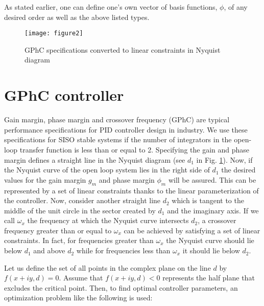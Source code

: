 \documentclass [12pt , a4paper] {report}
\begin{document}
As stated earlier, one can define one's own vector of basis functions, $\phi$, of any desired order as well as the above listed types.

\begin{figure}
\centering
{}
\texttt{[image: figure2]}
\caption{GPhC specifications converted to linear constraints in Nyquist diagram}
\label{fig:GPhC}
\end{figure}

\section{GPhC controller}
Gain margin, phase margin and crossover frequency (GPhC) are typical performance specifications for PID controller design in industry. We use these specifications for SISO stable systems if the number of integrators in the open-loop transfer function is less than or equal to 2. Specifying the gain and phase margin defines a straight line in the Nyquist diagram (see $d_1$ in Fig. \ref{fig:GPhC}). Now, if the Nyquist curve of the open loop system lies in the right side of $d_1$ the desired values for the gain margin $g_m$ and phase margin $\phi_m$ will be assured. This can be represented by a set of linear constraints thanks to the linear parameterization of the controller. Now, consider another straight line $d_2$ which is tangent to the middle of the unit circle in the sector created by $d_1$ and the imaginary axis. If we call $\omega_x$ the frequency at which the Nyquist curve intersects $d_2$, a crossover frequency greater than or equal to $\omega_x$ can be achieved by satisfying a set of linear constraints. In fact, for frequencies greater than $\omega_x$ the Nyquist curve should lie below $d_1$ and above $d_2$ while for frequencies less than $\omega_x$ it should lie below $d_2$.

Let us define the set of all points in the complex plane on the line $d$ by $f(x+iy, d) = 0$. Assume that $f(x+iy, d) < 0$ represents the half plane that excludes the critical point. Then, to find optimal controller parameters, an optimization problem like the following is used:
\end{document}

